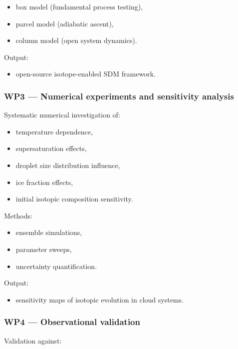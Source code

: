 \documentclass[11pt,a4paper]{article}
\begin{document}
\begin{itemize}
\item box model (fundamental process testing),


\item parcel model (adiabatic ascent),


\item column model (open system dynamics).


\end{itemize}
Output:

\begin{itemize}
\item open-source isotope-enabled SDM framework.


\end{itemize}
\subsubsection*{WP3 — Numerical experiments and sensitivity analysis}
Systematic numerical investigation of:

\begin{itemize}
\item temperature dependence,


\item supersaturation effects,


\item droplet size distribution influence,


\item ice fraction effects,


\item initial isotopic composition sensitivity.


\end{itemize}
Methods:

\begin{itemize}
\item ensemble simulations,


\item parameter sweeps,


\item uncertainty quantification.


\end{itemize}
Output:

\begin{itemize}
\item sensitivity maps of isotopic evolution in cloud systems.


\end{itemize}
\subsubsection*{WP4 — Observational validation}
Validation against:
\end{document}

